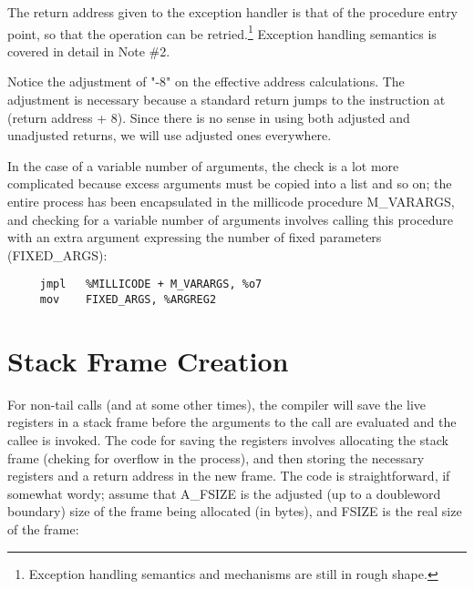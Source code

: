 The return address given to the exception handler is that of the procedure
entry point, so that the operation can be retried.\footnote{Exception
handling semantics and mechanisms are still in rough shape.} Exception
handling semantics is covered in detail in Note \#2.

Notice the adjustment of "-8" on the effective address calculations.
The adjustment is necessary because a standard return jumps to the
instruction at (return address + 8).  Since there is no sense in using
both adjusted and unadjusted returns, 
 we will use adjusted ones everywhere.

In the case of a variable number of arguments, the check is a lot more 
complicated because excess arguments must be copied into a list and so
on; the entire process has been encapsulated in the millicode procedure
M\_VARARGS, and checking for a variable number of arguments involves
calling this procedure with an extra argument expressing the number of
fixed parameters (FIXED\_ARGS):

\begin{minipage}{\linewidth}
\begin{verbatim}
     jmpl   %MILLICODE + M_VARARGS, %o7
     mov    FIXED_ARGS, %ARGREG2
\end{verbatim}
\end{minipage}

\section{Stack Frame Creation}

For non-tail calls (and at some other times), the compiler will save
the live registers in a stack frame before the arguments to the call
are evaluated and the callee is invoked. The code for saving the registers
involves
allocating the stack frame (cheking for overflow in the process), and
then storing the necessary registers and a return address in the new
frame. The code is straightforward, if somewhat wordy; assume that
A\_FSIZE is the adjusted (up to a doubleword boundary) size of the
frame being allocated (in bytes), and FSIZE is the real size of the
frame:

